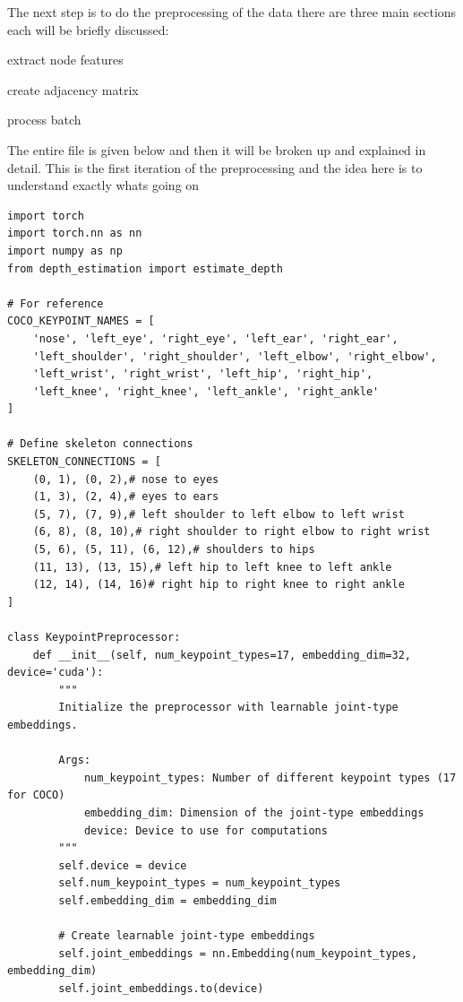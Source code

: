 The next step is to do the preprocessing of the data there are three main
sections each will be briefly discussed: 

\begin{compactitem}
\item extract node features 
\item create adjacency matrix 
\item process batch
\end{compactitem}

The entire file is given below and then it will be broken up and explained in detail.
This is the first iteration of the preprocessing and the idea here is to understand
exactly whats going on

\begin{lstlisting}[style=pythonstyle,title={Preprocessing May},label={code:preprocessing_may}]
import torch
import torch.nn as nn
import numpy as np
from depth_estimation import estimate_depth

# For reference
COCO_KEYPOINT_NAMES = [
    'nose', 'left_eye', 'right_eye', 'left_ear', 'right_ear',
    'left_shoulder', 'right_shoulder', 'left_elbow', 'right_elbow',
    'left_wrist', 'right_wrist', 'left_hip', 'right_hip',
    'left_knee', 'right_knee', 'left_ankle', 'right_ankle'
]

# Define skeleton connections
SKELETON_CONNECTIONS = [
    (0, 1), (0, 2),# nose to eyes
    (1, 3), (2, 4),# eyes to ears
    (5, 7), (7, 9),# left shoulder to left elbow to left wrist
    (6, 8), (8, 10),# right shoulder to right elbow to right wrist
    (5, 6), (5, 11), (6, 12),# shoulders to hips
    (11, 13), (13, 15),# left hip to left knee to left ankle
    (12, 14), (14, 16)# right hip to right knee to right ankle
]

class KeypointPreprocessor:
    def __init__(self, num_keypoint_types=17, embedding_dim=32, device='cuda'):
        """
        Initialize the preprocessor with learnable joint-type embeddings.
        
        Args:
            num_keypoint_types: Number of different keypoint types (17 for COCO)
            embedding_dim: Dimension of the joint-type embeddings
            device: Device to use for computations
        """
        self.device = device
        self.num_keypoint_types = num_keypoint_types
        self.embedding_dim = embedding_dim
        
        # Create learnable joint-type embeddings
        self.joint_embeddings = nn.Embedding(num_keypoint_types, embedding_dim)
        self.joint_embeddings.to(device)
    

\end{lstlisting}
